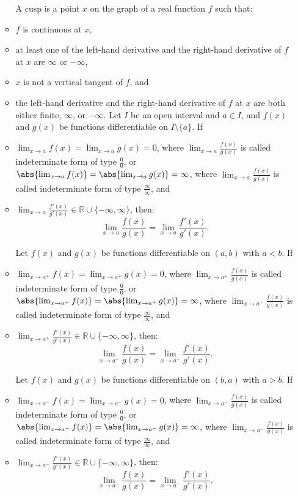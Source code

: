 \documentclass[a4paper,12pt]{report}
\begin{document}
\begin{itemize}
\begin{itemize}
A cusp is a point $x$ on the graph of a real function $f$ such that:
\bit
\item $f$ is continuous at $x$,
\item at least one of the left-hand derivative and the right-hand derivative of $f$ at $x$ are $\infty$ or $-\infty$,
\item $x$ is not a vertical tangent of $f$, and
\item the left-hand derivative and the right-hand derivative of $f$ at $x$ are both either finite, $\infty$, or $-\infty$.
\eit
{}
Let $I$ be an open interval and $a\in I$, and $f(x)$ and $g(x)$ be functions differentiable on $I\setminus\{a\}$. If
\bit
\item $\lim_{x\to a}f(x)=\lim_{x\to a}g(x)=0$, where $\lim_{x\to a}\frac{f(x)}{g(x)}$ is called indeterminate form of type $\frac{0}{0}$, or $\abs{\lim_{x\to a}f(x)}=\abs{\lim_{x\to a}g(x)}=\infty$, where $\lim_{x\to a}\frac{f(x)}{g(x)}$ is called indeterminate form of type $\frac{\infty}{\infty}$, and
\item $\lim_{x\to a}\frac{f'(x)}{g'(x)}\in\mathbb{R}\cup\{-\infty,\infty\}$,
\eit
then:
\[\lim_{x\to a}\frac{f(x)}{g(x)}=\lim_{x\to a}\frac{f'(x)}{g'(x)}.\]

Let $f(x)$ and $g(x)$ be functions differentiable on $(a,b)$ with $a<b$. If
\bit
\item $\lim_{x\to a^+}f(x)=\lim_{x\to a^+}g(x)=0$, where $\lim_{x\to a^+}\frac{f(x)}{g(x)}$ is called indeterminate form of type $\frac{0}{0}$, or $\abs{\lim_{x\to a^+}f(x)}=\abs{\lim_{x\to a^+}g(x)}=\infty$, where $\lim_{x\to a^+}\frac{f(x)}{g(x)}$ is called indeterminate form of type $\frac{\infty}{\infty}$, and
\item $\lim_{x\to a^+}\frac{f'(x)}{g'(x)}\in\mathbb{R}\cup\{-\infty,\infty\}$,
\eit
then:
\[\lim_{x\to a^+}\frac{f(x)}{g(x)}=\lim_{x\to a^+}\frac{f'(x)}{g'(x)}.\]

Let $f(x)$ and $g(x)$ be functions differentiable on $(b,a)$ with $a>b$. If
\bit
\item $\lim_{x\to a^-}f(x)=\lim_{x\to a^-}g(x)=0$, where $\lim_{x\to a^-}\frac{f(x)}{g(x)}$ is called indeterminate form of type $\frac{0}{0}$, or $\abs{\lim_{x\to a^-}f(x)}=\abs{\lim_{x\to a^-}g(x)}=\infty$, where $\lim_{x\to a^-}\frac{f(x)}{g(x)}$ is called indeterminate form of type $\frac{\infty}{\infty}$, and
\item $\lim_{x\to a^-}\frac{f'(x)}{g'(x)}\in\mathbb{R}\cup\{-\infty,\infty\}$,
\eit
then:
\[\lim_{x\to a^-}\frac{f(x)}{g(x)}=\lim_{x\to a^-}\frac{f'(x)}{g'(x)}.\]


\end{itemize}
\end{itemize}
\end{document}
